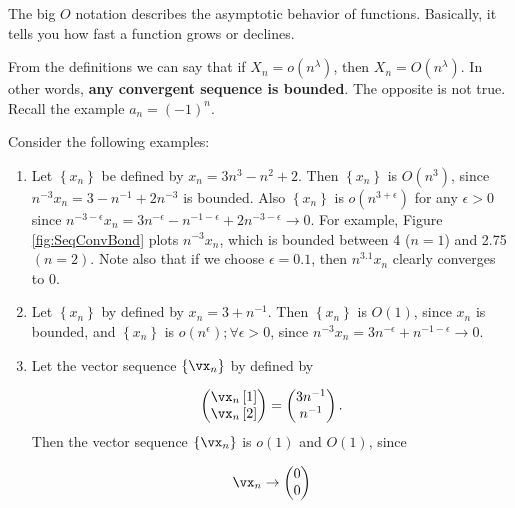\documentclass[english,12pt]{book}\usepackage[]{graphicx}\usepackage[]{xcolor}
\begin{document}
The big $O$ notation describes the asymptotic behavior of functions. Basically, it tells you how fast a function grows or declines. 

\begin{remark}
From the definitions we can say that if $X_n = o(n^\lambda)$, then $X_n = O(n^\lambda)$. In other words, \textbf{any convergent sequence is bounded}. The opposite is not true. Recall the example $a_n = (-1)^n$.
\end{remark}

\begin{example}
Consider the following examples:

\begin{enumerate}
  \item Let $\left\lbrace x_n\right\rbrace$ be defined by $x_n = 3n^3 - n^2 + 2$. Then $\left\lbrace x_n\right\rbrace$ is $O(n^3)$, since $n^{-3}x_n = 3 - n^{-1} + 2n^{-3}$ is bounded. Also $\left\lbrace x_n\right\rbrace$ is $o(n^{3 + \epsilon})$ for any $\epsilon > 0$ since $n^{ - 3 - \epsilon}x_n = 3n^{-\epsilon} - n^{-1 - \epsilon} + 2n^{-3 - \epsilon}\to 0$. For example, Figure \ref{fig:SeqConvBond} plots $n^{-3}x_n$, which is bounded between 4 ($n = 1$) and 2.75 $(n = 2)$. Note also that if we choose $\epsilon = 0.1$, then $n^{3.1}x_n$ clearly converges to 0.
  \item Let $\left\lbrace x_n\right\rbrace$ by defined by $x_n = 3 + n^{-1}$. Then $\left\lbrace x_n\right\rbrace$ is $O(1)$, since $x_n$ is bounded, and $\left\lbrace x_n\right\rbrace$ is $o(n^\epsilon);\forall \epsilon > 0$, since $n^{-3}x_n = 3n^{-\epsilon} + n^{-1 - \epsilon}\to 0$. 
  \item Let the vector sequence $\left\lbrace \vx_n\right\rbrace$ by defined by
  
  \begin{equation*}
    \begin{pmatrix}
    \vx_n\left[1\right] \\
    \vx_n\left[2\right]
    \end{pmatrix}= 
    \begin{pmatrix}
      3n^{-1} \\
      n^{-1}
    \end{pmatrix}.
  \end{equation*}
  Then the vector sequence $\left\lbrace \vx_n\right\rbrace$ is $o(1)$ and $O(1)$, since
  
  \begin{equation*}
    \vx_n \to \begin{pmatrix} 0 \\ 0 \end{pmatrix}
  \end{equation*}
\end{enumerate}
\end{example}
\end{document}
